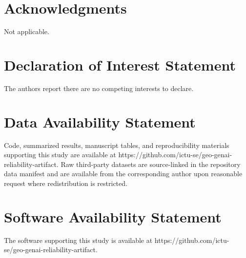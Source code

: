\documentclass[]{interact}
\begin{document}
\section*{Acknowledgments}

Not applicable.

\section*{Declaration of Interest Statement}

The authors report there are no competing interests to declare.

\section*{Data Availability Statement}

Code, summarized results, manuscript tables, and reproducibility materials supporting this study are available at https://github.com/ictu-se/geo-genai-reliability-artifact. Raw third-party datasets are source-linked in the repository data manifest and are available from the corresponding author upon reasonable request where redistribution is restricted.

\section*{Software Availability Statement}

The software supporting this study is available at https://github.com/ictu-se/geo-genai-reliability-artifact.


\clearpage
\nocite{*}


\end{document}
